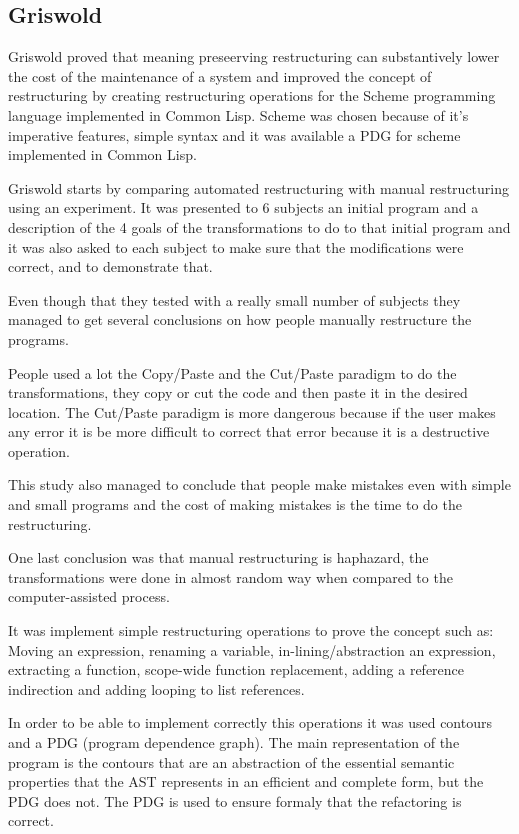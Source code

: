 \subsection{Griswold}
Griswold \cite{griswold1991program} proved that meaning preseerving restructuring can substantively lower the cost of the maintenance of a system and improved the concept of restructuring by creating restructuring operations for the Scheme programming language implemented in Common Lisp. Scheme was chosen because of it's imperative features, simple syntax and it was available a PDG for scheme implemented in Common Lisp.


Griswold starts by comparing automated restructuring with manual restructuring using an experiment. It was presented to 6 subjects an initial program and a description of the 4 goals of the transformations to do to that initial program and it was also asked to each subject to make sure that the modifications were correct, and to demonstrate that. 

Even though that they tested with a really small number of subjects they managed to get several conclusions on how people manually restructure the programs.


People used a lot the Copy/Paste and the Cut/Paste paradigm to do the transformations, they copy or cut the code and then paste it in the desired location.
The Cut/Paste paradigm is more dangerous because if the user makes any error it is be more difficult to correct that error because it is a destructive operation.


This study also managed to conclude that people make mistakes even with simple and small programs and the cost of making mistakes is the time to do the restructuring.

One last conclusion was that manual restructuring is haphazard, the transformations were done in almost random way when compared to the computer-assisted process.


It was implement simple restructuring operations to prove the concept such as: Moving an expression, renaming a variable, in-lining/abstraction an expression, extracting a function, scope-wide function replacement, adding a reference indirection and adding looping to list references.


In order to be able to implement correctly this operations it was used contours and a PDG (program dependence graph). The main representation of the program is the contours that are an abstraction of the essential semantic properties that the AST represents in an efficient and complete form, but the PDG does not.
The PDG is used to ensure formaly that the refactoring is correct.

